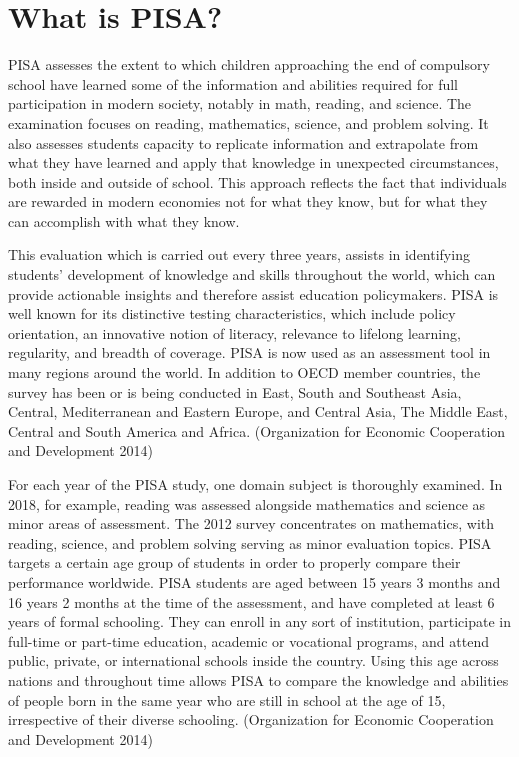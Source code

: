 \hypertarget{what-is-pisa}{%
\section{What is PISA?}\label{what-is-pisa}}

PISA assesses the extent to which children approaching the end of compulsory school have learned some of the information and abilities required for full participation in modern society, notably in math, reading, and science. The examination focuses on reading, mathematics, science, and problem solving. It also assesses students capacity to replicate information and extrapolate from what they have learned and apply that knowledge in unexpected circumstances, both inside and outside of school. This approach reflects the fact that individuals are rewarded in modern economies not for what they know, but for what they can accomplish with what they know.

This evaluation which is carried out every three years, assists in identifying students' development of knowledge and skills throughout the world, which can provide actionable insights and therefore assist education policymakers. PISA is well known for its distinctive testing characteristics, which include policy orientation, an innovative notion of literacy, relevance to lifelong learning, regularity, and breadth of coverage. PISA is now used as an assessment tool in many regions around the world. In addition to OECD member countries, the survey has been or is being conducted in East, South and Southeast Asia, Central, Mediterranean and Eastern Europe, and Central Asia, The Middle East, Central and South America and Africa. (Organization for Economic Cooperation and Development 2014)

For each year of the PISA study, one domain subject is thoroughly examined. In 2018, for example, reading was assessed alongside mathematics and science as minor areas of assessment. The 2012 survey concentrates on mathematics, with reading, science, and problem solving serving as minor evaluation topics. PISA targets a certain age group of students in order to properly compare their performance worldwide. PISA students are aged between 15 years 3 months and 16 years 2 months at the time of the assessment, and have completed at least 6 years of formal schooling. They can enroll in any sort of institution, participate in full-time or part-time education, academic or vocational programs, and attend public, private, or international schools inside the country. Using this age across nations and throughout time allows PISA to compare the knowledge and abilities of people born in the same year who are still in school at the age of 15, irrespective of their diverse schooling. (Organization for Economic Cooperation and Development 2014)


